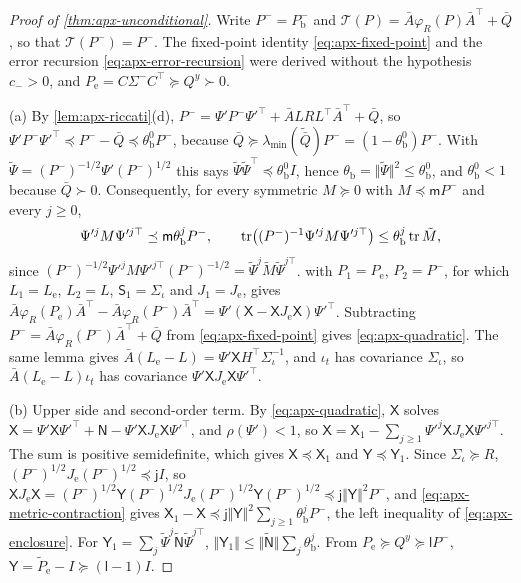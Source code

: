 \begin{proof}[Proof of \cref{thm:apx-unconditional}]
Write $P^-=P^-_{\mathrm b}$ and $\mathcal T(P)=\bar A\varphi_R(P)\bar A^\top+\bar Q$, so that $\mathcal T(P^-)=P^-$. The fixed-point identity \cref{eq:apx-fixed-point} and the error recursion \cref{eq:apx-error-recursion} were derived without the hypothesis $c_->0$, and $P_{\mathrm e}=C\Sigma^-C^\top\succeq Q^y\succ0$.

(a) By \cref{lem:apx-riccati}(d), $P^-=\Psi'P^-\Psi'^\top+\bar ALRL^\top\bar A^\top+\bar Q$, so $\Psi'P^-\Psi'^\top\preceq P^--\bar Q\preceq\theta^0_{\mathrm b}P^-$, because $\bar Q\succeq\lambda_{\min}(\tilde{\bar Q})P^-=(1-\theta^0_{\mathrm b})P^-$. With $\tilde\Psi=(P^-)^{-1/2}\Psi'(P^-)^{1/2}$ this says $\tilde\Psi\tilde\Psi^\top\preceq\theta^0_{\mathrm b}I$, hence $\theta_{\mathrm b}=\Vert\tilde\Psi\Vert^2\le\theta^0_{\mathrm b}$, and $\theta^0_{\mathrm b}<1$ because $\bar Q\succ0$. Consequently, for every symmetric $M\succeq0$ with $M\preceq\mathsf mP^-$ and every $j\ge0$,
\begin{equation}\label{eq:apx-metric-contraction}
\Psi'^jM\Psi'^{j\top}\preceq\mathsf m\theta_{\mathrm b}^jP^-,\qquad\operatorname{tr}\bigl((P^-)^{-1}\Psi'^jM\Psi'^{j\top}\bigr)\le\theta_{\mathrm b}^j\operatorname{tr}\tilde M ,
\end{equation}
since $(P^-)^{-1/2}\Psi'^jM\Psi'^{j\top}(P^-)^{-1/2}=\tilde\Psi^j\tilde M\tilde\Psi^{j\top}$.  with $P_1=P_{\mathrm e}$, $P_2=P^-$, for which $L_1=L_{\mathrm e}$, $L_2=L$, $\mathsf S_1=\Sigma_\iota$ and $J_1=J_{\mathrm e}$, gives $\bar A\varphi_R(P_{\mathrm e})\bar A^\top-\bar A\varphi_R(P^-)\bar A^\top=\Psi'(\mathsf X-\mathsf XJ_{\mathrm e}\mathsf X)\Psi'^\top$. Subtracting $P^-=\bar A\varphi_R(P^-)\bar A^\top+\bar Q$ from \cref{eq:apx-fixed-point} gives \cref{eq:apx-quadratic}. The same lemma gives $\bar A(L_{\mathrm e}-L)=\Psi'\mathsf XH^\top\Sigma_\iota^{-1}$, and $\iota_t$ has covariance $\Sigma_\iota$, so $\bar A(L_{\mathrm e}-L)\iota_t$ has covariance $\Psi'\mathsf XJ_{\mathrm e}\mathsf X\Psi'^\top$.

(b) Upper side and second-order term. By \cref{eq:apx-quadratic}, $\mathsf X$ solves $\mathsf X=\Psi'\mathsf X\Psi'^\top+\mathsf N-\Psi'\mathsf XJ_{\mathrm e}\mathsf X\Psi'^\top$, and $\rho(\Psi')<1$, so $\mathsf X=\mathsf X_1-\sum_{j\ge1}\Psi'^j\mathsf XJ_{\mathrm e}\mathsf X\Psi'^{j\top}$. The sum is positive semidefinite, which gives $\mathsf X\preceq\mathsf X_1$ and $\mathsf Y\preceq\mathsf Y_1$. Since $\Sigma_\iota\succeq R$, $(P^-)^{1/2}J_{\mathrm e}(P^-)^{1/2}\preceq\mathsf jI$, so $\mathsf XJ_{\mathrm e}\mathsf X=(P^-)^{1/2}\mathsf Y(P^-)^{1/2}J_{\mathrm e}(P^-)^{1/2}\mathsf Y(P^-)^{1/2}\preceq\mathsf j\Vert\mathsf Y\Vert^2P^-$, and \cref{eq:apx-metric-contraction} gives $\mathsf X_1-\mathsf X\preceq\mathsf j\Vert\mathsf Y\Vert^2\sum_{j\ge1}\theta_{\mathrm b}^jP^-$, the left inequality of \cref{eq:apx-enclosure}. For $\mathsf Y_1=\sum_j\tilde\Psi^j\tilde{\mathsf N}\tilde\Psi^{j\top}$, $\Vert\mathsf Y_1\Vert\le\Vert\tilde{\mathsf N}\Vert\sum_j\theta_{\mathrm b}^j$. From $P_{\mathrm e}\succeq Q^y\succeq\mathsf lP^-$, $\mathsf Y=\tilde P_{\mathrm e}-I\succeq(\mathsf l-1)I$.


\end{proof}
